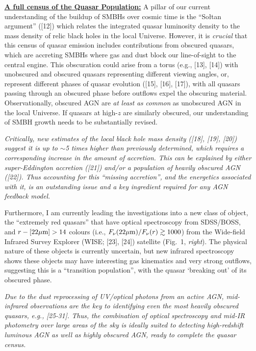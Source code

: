 \documentclass[oneside, a4paper, onecolumn, 11pt]{article}
\begin{document}
\smallskip
\smallskip
\noindent
{\bf \underline {A full census of the Quasar Population:}}
A pillar of our current understanding of the buildup of SMBHs over
cosmic time is the ``So{\l}tan argument'' ([12]) which relates the
integrated quasar luminosity density to the mass density of relic
black holes in the local Universe.  However, it is \emph{crucial} that
this census of quasar emission includes contributions from obscured
quasars, which are accreting SMBHs where gas and dust block our
line-of-sight to the central engine.
This obscuration could arise from a torus (e.g., [13], [14]) with
unobscured and obscured quasars representing different viewing angles,
or, represent different phases of quasar evolution ([15], [16], [17]),
with all quasars passing through an obscured phase before outflows
expel the obscuring material. Observationally, obscured AGN are 
{\it at least as common} as unobscured AGN in the local Universe. If
quasars at high-$z$ are similarly obscured, our understanding of SMBH
growth needs to be substantially revised.

\smallskip
\smallskip
\noindent
{\it Critically, new estimates of the local black hole mass density
([18], [19], [20]) suggest it is up to $\sim$5 times higher than
previously determined, which requires a corresponding increase
in the amount of accretion. This can be explained by either
super-Eddington accretion ([21]) and/or a population of heavily
obscured AGN ([22]). Thus accounting for this ``missing accretion'',
and the energetics associated with it, is an outstanding issue and a
key ingredient required for any AGN feedback model.  }

\smallskip
\smallskip
\noindent 
Furthermore, I am currently leading the investigations into a new
class of object, the ``extremely red quasars'' that have optical
spectroscopy from SDSS/BOSS, and $r-[22\mu{\rm m}]>14$ colours 
(i.e., $F_\nu({\rm 22\mu m})/F_\nu(r) \gtrsim 1000$)
from the Wide-field Infrared Survey Explorer (WISE; [23], [24]) satellite
(Fig.~1, {\it right}).
The physical nature of these objects is currently uncertain, but new
infrared spectroscopy shows these objects may have interesting
gas kinematics and very strong outflows, suggesting this is a ``transition
population'', with the quasar `breaking out' of its obscured phase. 

\smallskip
\smallskip
\noindent
{\it 
Due to the dust reprocessing of UV/optical photons from an active AGN, 
mid-infrared observations are the key to identifying even the most
heavily obscured quasars, e.g., [25-31]. 
Thus, the combination of optical spectroscopy and mid-IR photometry over
large areas of the sky is ideally suited to detecting high-redshift
luminous AGN as well as highly obscured AGN, ready to complete the 
quasar census.
}
\end{document}
